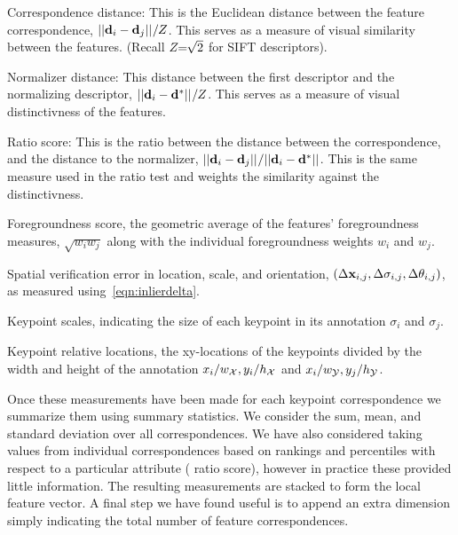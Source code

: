 \begin{itemln}

    \item Correspondence distance:
    This is the Euclidean distance between the feature correspondence, $||\mathbf{d}_i - \mathbf{d}_j||_{} / Z$.
    This serves as a measure of visual similarity between the features.
    (Recall $Z\mkern-6mu=\mkern-6mu\sqrt{2}$ for SIFT descriptors).

    \item Normalizer distance:
    This distance between the first descriptor and the normalizing descriptor, %
        $||\mathbf{d}_i - \mathbf{d}^{*}||_{} / Z$.
        This serves as a measure of visual distinctivness of the features.

    \item Ratio score:
    This is the ratio between the distance between the correspondence, and the distance to the normalizer, %
        $||\mathbf{d}_i - \mathbf{d}_j||_{} / ||\mathbf{d}_i - \mathbf{d}^{*}||_{}$.
        This is the same measure used in the ratio test and weights the similarity against the distinctivness.

    \item Foregroundness score, the geometric average of the features' foregroundness measures, $\sqrt{w_i w_j}$
      along with the individual foregroundness weights $w_i$ and $w_j$.
        
    \item Spatial verification error in location, scale, and orientation, $( %
        \Delta \pt_{i, j}, %
        \Delta \scale_{i, j}, %
        \Delta \ori_{i, j})$, as measured using~\cref{eqn:inlierdelta}.

    \item Keypoint scales, indicating the size of each keypoint in its annotation $\sigma_i$ and $\sigma_j$.

    \item Keypoint relative locations, the xy-locations of the keypoints divided by the width and height of the
      annotation $x_i / w_{\mathcal{X}}, y_i / h_{\mathcal{X}}$ and $x_i / w_{\mathcal{Y}}, y_j / h_{\mathcal{Y}}$.
\end{itemln}

Once these measurements have been made for each keypoint correspondence we summarize them using summary
  statistics.
We consider the sum, mean, and standard deviation over all correspondences.
We have also considered taking values from individual correspondences based on rankings and percentiles with
  respect to a particular attribute (\eg{} ratio score), however in practice these provided little information.
The resulting measurements are stacked to form the local feature vector.
A final step we have found useful is to append an extra dimension simply indicating the total number of feature
  correspondences.

